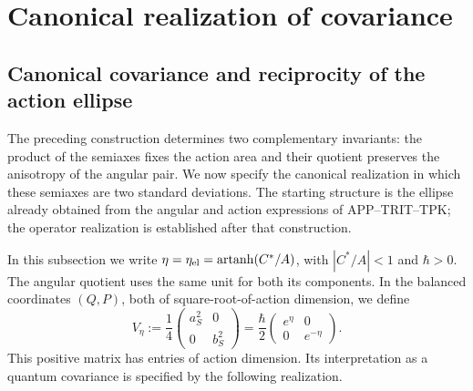 \chapter{Canonical realization of covariance}
\label{x_reciprocidad:nuclear:covarianza-antecedente}


\section{Canonical covariance and reciprocity of the action ellipse}
\label{x_reciprocidad:sec:ii-area-covarianza}

The preceding construction determines two complementary invariants: the product of the semiaxes fixes the action area and their quotient preserves the anisotropy of the angular pair. We now specify the canonical realization in which these semiaxes are two standard deviations. The starting structure is the ellipse already obtained from the angular and action expressions of APP--TRIT--TPK; the operator realization is established after that construction.

In this subsection we write \(\eta=\eta_{\rm el}
=\operatorname{artanh}(C^*/A)\), with \(|C^*/A|<1\) and \(\hbar>0\). The angular quotient uses the same unit for both its components. In the balanced coordinates \((Q,P)\), both of square-root-of-action dimension, we define
\begin{equation}
 V_\eta:=\frac14
 \begin{pmatrix}a_S^2&0\\0&b_S^2\end{pmatrix}
 =\frac{\hbar}{2}
 \begin{pmatrix}e^\eta&0\\0&e^{-\eta}\end{pmatrix}.
 \label{x_reciprocidad:eq:ii-covarianza-geometrica}
\end{equation}
This positive matrix has entries of action dimension. Its interpretation as a quantum covariance is specified by the following realization.

